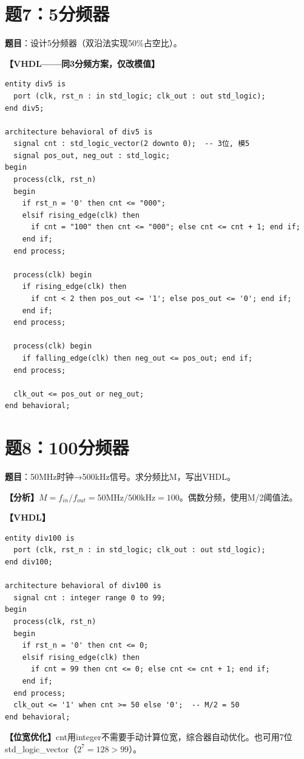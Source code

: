 \section{题7：5分频器}

\textbf{题目}：设计5分频器（双沿法实现50\%占空比）。

\begin{solution}[完整解答]

\textbf{【VHDL——同3分频方案，仅改模值】}
\begin{lstlisting}
entity div5 is
  port (clk, rst_n : in std_logic; clk_out : out std_logic);
end div5;

architecture behavioral of div5 is
  signal cnt : std_logic_vector(2 downto 0);  -- 3位, 模5
  signal pos_out, neg_out : std_logic;
begin
  process(clk, rst_n)
  begin
    if rst_n = '0' then cnt <= "000";
    elsif rising_edge(clk) then
      if cnt = "100" then cnt <= "000"; else cnt <= cnt + 1; end if;
    end if;
  end process;

  process(clk) begin
    if rising_edge(clk) then
      if cnt < 2 then pos_out <= '1'; else pos_out <= '0'; end if;
    end if;
  end process;

  process(clk) begin
    if falling_edge(clk) then neg_out <= pos_out; end if;
  end process;

  clk_out <= pos_out or neg_out;
end behavioral;
\end{lstlisting}

\end{solution}


\section{题8：100分频器}

\textbf{题目}：50MHz时钟→500kHz信号。求分频比M，写出VHDL。

\begin{solution}[完整解答]

\textbf{【分析】}$M = f_{in}/f_{out} = 50\text{MHz}/500\text{kHz} = 100$。偶数分频，使用M/2阈值法。

\textbf{【VHDL】}
\begin{lstlisting}
entity div100 is
  port (clk, rst_n : in std_logic; clk_out : out std_logic);
end div100;

architecture behavioral of div100 is
  signal cnt : integer range 0 to 99;
begin
  process(clk, rst_n)
  begin
    if rst_n = '0' then cnt <= 0;
    elsif rising_edge(clk) then
      if cnt = 99 then cnt <= 0; else cnt <= cnt + 1; end if;
    end if;
  end process;
  clk_out <= '1' when cnt >= 50 else '0';  -- M/2 = 50
end behavioral;
\end{lstlisting}

\textbf{【位宽优化】}cnt用integer不需要手动计算位宽，综合器自动优化。也可用7位std\_logic\_vector（$2^7=128>99$）。

\end{solution}


